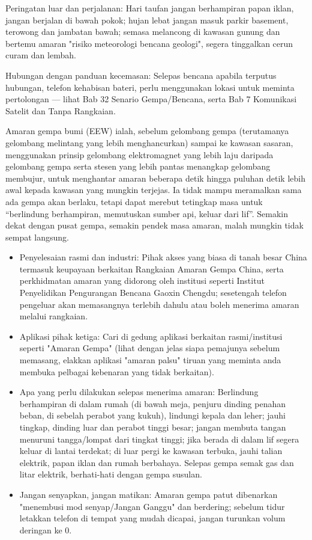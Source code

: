 Peringatan luar dan perjalanan: Hari taufan jangan berhampiran papan iklan, jangan berjalan di bawah pokok; hujan lebat jangan masuk parkir basement, terowong dan jambatan bawah; semasa melancong di kawasan gunung dan bertemu amaran "risiko meteorologi bencana geologi", segera tinggalkan cerun curam dan lembah.

Hubungan dengan panduan kecemasan: Selepas bencana apabila terputus hubungan, telefon kehabisan bateri, perlu menggunakan lokasi untuk meminta pertolongan — lihat Bab 32 Senario Gempa/Bencana, serta Bab 7 Komunikasi Satelit dan Tanpa Rangkaian.


Amaran gempa bumi (EEW) ialah, sebelum gelombang gempa (terutamanya gelombang melintang yang lebih menghancurkan) sampai ke kawasan sasaran, menggunakan prinsip gelombang elektromagnet yang lebih laju daripada gelombang gempa serta stesen yang lebih pantas menangkap gelombang membujur, untuk menghantar amaran beberapa detik hingga puluhan detik lebih awal kepada kawasan yang mungkin terjejas. Ia tidak mampu meramalkan sama ada gempa akan berlaku, tetapi dapat merebut tetingkap masa untuk “berlindung berhampiran, memutuskan sumber api, keluar dari lif”. Semakin dekat dengan pusat gempa, semakin pendek masa amaran, malah mungkin tidak sempat langsung.

\begin{itemize}
  \item Penyelesaian rasmi dan industri: Pihak akses yang biasa di tanah besar China termasuk keupayaan berkaitan Rangkaian Amaran Gempa China, serta perkhidmatan amaran yang didorong oleh institusi seperti Institut Penyelidikan Pengurangan Bencana Gaoxin Chengdu; sesetengah telefon pengeluar akan memasangnya terlebih dahulu atau boleh menerima amaran melalui rangkaian.
  \item Aplikasi pihak ketiga: Cari di gedung aplikasi berkaitan rasmi/institusi seperti "Amaran Gempa" (lihat dengan jelas siapa pemajunya sebelum memasang, elakkan aplikasi "amaran palsu" tiruan yang meminta anda membuka pelbagai kebenaran yang tidak berkaitan).
  \item Apa yang perlu dilakukan selepas menerima amaran: Berlindung berhampiran di dalam rumah (di bawah meja, penjuru dinding penahan beban, di sebelah perabot yang kukuh), lindungi kepala dan leher; jauhi tingkap, dinding luar dan perabot tinggi besar; jangan membuta tangan menuruni tangga/lompat dari tingkat tinggi; jika berada di dalam lif segera keluar di lantai terdekat; di luar pergi ke kawasan terbuka, jauhi talian elektrik, papan iklan dan rumah berbahaya. Selepas gempa semak gas dan litar elektrik, berhati-hati dengan gempa susulan.
  \item Jangan senyapkan, jangan matikan: Amaran gempa patut dibenarkan "menembusi mod senyap/Jangan Ganggu" dan berdering; sebelum tidur letakkan telefon di tempat yang mudah dicapai, jangan turunkan volum deringan ke 0.
\end{itemize}

